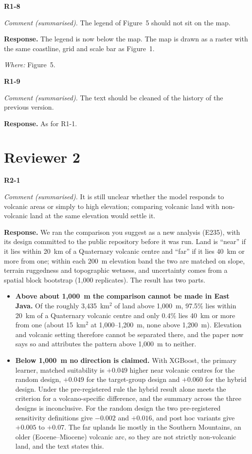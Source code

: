 \documentclass[11pt,a4paper]{article}
\newcommand{\comment}[1]{\par\noindent\textit{Comment (summarised).} #1\par}
\newcommand{\response}{\par\noindent\textbf{Response.} }
\newcommand{\where}[1]{\par\noindent\textit{Where:} #1\par\medskip}
\begin{document}
\textbf{R1-8}
\comment{The legend of Figure~5 should not sit on the map.}
\response The legend is now below the map. The map is drawn as a raster with the same coastline, grid and scale bar as
Figure~1.
\where{Figure~5.}

\textbf{R1-9}
\comment{The text should be cleaned of the history of the previous version.}
\response As for R1-1.

\section*{Reviewer 2}

\textbf{R2-1}
\comment{It is still unclear whether the model responds to volcanic areas or simply to high elevation; comparing
volcanic land with non-volcanic land at the same elevation would settle it.}
\response We ran the comparison you suggest as a new analysis (E235), with its design committed to the public
repository before it was run. Land is ``near'' if it lies within 20~km of a Quaternary volcanic centre and ``far'' if it
lies 40~km or more from one; within each 200~m elevation band the two are matched on slope, terrain ruggedness and
topographic wetness, and uncertainty comes from a spatial block bootstrap (1,000 replicates). The result has two parts.
\begin{itemize}
  \item \textbf{Above about 1,000~m the comparison cannot be made in East Java.} Of the roughly 3,435~km$^2$ of land
        above 1,000~m, 97.5\% lies within 20~km of a Quaternary volcanic centre and only 0.4\% lies 40~km or more
        from one (about 15~km$^2$ at 1,000--1,200~m, none above 1,200~m). Elevation and volcanic setting therefore
        cannot be separated there, and the paper now says so and attributes the pattern above 1,000~m to neither.
  \item \textbf{Below 1,000~m no direction is claimed.} With XGBoost, the primary learner, matched suitability is
        $+0.049$ higher near volcanic centres for the random design, $+0.049$ for the target-group design and $+0.060$
        for the hybrid design. Under the pre-registered rule the hybrid result alone meets the criterion for a
        volcano-specific difference, and the summary across the three designs is inconclusive. For the random design
        the two pre-registered sensitivity definitions give $-0.002$ and $+0.016$, and post hoc variants give $+0.005$
        to $+0.07$. The far uplands lie mostly in the Southern Mountains, an older (Eocene--Miocene) volcanic arc, so
        they are not strictly non-volcanic land, and the text states this.
\end{itemize}
\end{document}
